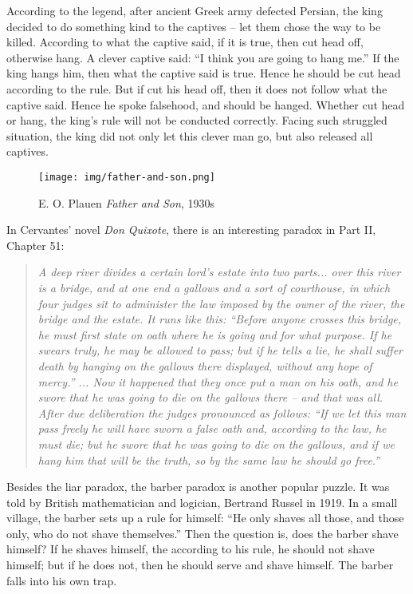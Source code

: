 \documentclass[b5paper]{article}
\begin{document}
According to the legend, after ancient Greek army defected Persian, the king decided to do something kind to the captives -- let them chose the way to be killed. According to what the captive said, if it is true, then cut head off, otherwise hang. A clever captive said: ``I think you are going to hang me.'' If the king hangs him, then what the captive said is true. Hence he should be cut head according to the rule. But if cut his head off, then it does not follow what the captive said. Hence he spoke falsehood, and should be hanged. Whether cut head or hang, the king's rule will not be conducted correctly. Facing such struggled situation, the king did not only let this clever man go, but also released all captives.

\begin{wrapfigure}{L}{0.5\textwidth}
 \centering
 \texttt{[image: img/father-and-son.png]}
 \captionsetup{labelformat=empty}
 \caption{E. O. Plauen {\em Father and Son}, 1930s}
 \label{fig:father-and-son}
\end{wrapfigure}

In Cervantes' novel {\em Don Quixote}, there is an interesting paradox in Part II, Chapter 51:

\begin{quotation}
\itshape
A deep river divides a certain lord’s estate into two parts... over this river is a bridge, and at one end a gallows and a sort of courthouse, in which four judges sit to administer the law imposed by the owner of the river, the bridge and the estate. It runs like this: ``Before anyone crosses this bridge, he must first state on oath where he is going and for what purpose. If he swears truly, he may be allowed to pass; but if he tells a lie, he shall suffer death by hanging on the gallows there displayed, without any hope of mercy.'' ... Now it happened that they once put a man on his oath, and he swore that he was going to die on the gallows there -- and that was all. After due deliberation the judges pronounced as follows: ``If we let this man pass freely he will have sworn a false oath and, according to the law, he must die; but he swore that he was going to die on the gallows, and if we hang him that will be the truth, so by the same law he should go free.''
\end{quotation}

Besides the liar paradox, the barber paradox is another popular puzzle. It was told by British mathematician and logician, Bertrand Russel in 1919. In a small village, the barber sets up a rule for himself: ``He only shaves all those, and those only, who do not shave themselves.'' Then the question is, does the barber shave himself? If he shaves himself, the according to his rule, he should not shave himself; but if he does not, then he should serve and shave himself. The barber falls into his own trap.
\end{document}
